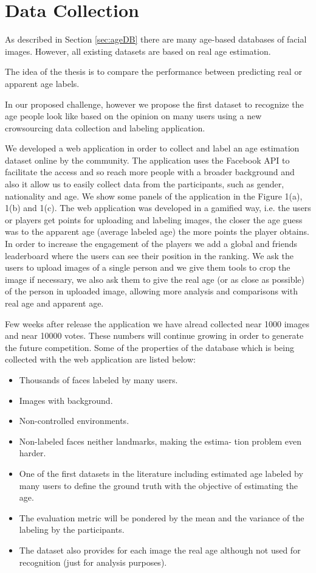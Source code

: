 \chapter{Data Collection} \label{chap:data}

As described in Section \ref{sec:ageDB} there are many age-based databases of facial images. However, all existing datasets are based on real age estimation. 

The idea of the thesis is to compare the performance between predicting real or apparent age labels.


In our proposed challenge, however we propose the first dataset to recognize the age people look like based on the opinion on many users using a new crowsourcing data collection and labeling application.

We developed a web application in order to collect and label an age estimation dataset online by the community. The application uses the Facebook API to facilitate the access and so reach more people with a broader background and also it allow us to easily collect data from the participants, such as gender, nationality and age. We show some panels of the application in the Figure 1(a), 1(b) and 1(c).
The web application was developed in a gamified way, i.e. the users or players get points for uploading and labeling images, the closer the age guess was to the apparent age (average labeled age) the more points the player obtains. In order to increase the engagement of the players we add a global and friends leaderboard where the users can see their position in the ranking. We ask the users to upload images of a single person and we give them tools to crop the image if necessary, we also ask them to give the real age (or as close as possible) of the person in uploaded image, allowing more analysis and
comparisons with real age and apparent age.

Few weeks after release the application we have alread collected near 1000 images and near 10000 votes. These numbers will continue growing in order to generate the future competition. Some of the properties of the database which is being collected with the web application are listed below:

\begin{itemize}
	\item Thousands of faces labeled by many users.
	\item Images with background.
	\item Non-controlled environments.
	\item Non-labeled faces neither landmarks, making the estima-
	tion problem even harder.
	\item One of the first datasets in the literature including
	estimated age labeled by many users to define the ground truth
	with the objective of estimating the age.
	\item The evaluation metric will be pondered by the mean and
	the variance of the labeling by the participants.
	\item The dataset also provides for each image the real age
	although not used for recognition (just for analysis purposes).
\end{itemize}

